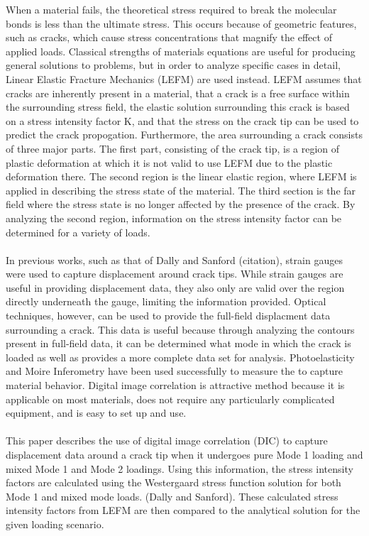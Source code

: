 \documentclass[12pt]{article}
\begin{document}
When a material fails, the theoretical stress required to break the molecular bonds is less than the ultimate stress. This occurs because of geometric features, such as cracks, which cause stress concentrations that magnify the effect of applied loads. Classical strengths of materials equations are useful for producing general solutions to problems, but in order to analyze specific cases in detail, Linear Elastic Fracture Mechanics (LEFM) are used instead. LEFM assumes that cracks are inherently present in a material, that a crack is a free surface within the surrounding stress field, the elastic solution surrounding this crack is based on a stress intensity factor K, and that the stress on the crack tip can be used to predict the crack propogation. Furthermore, the area surrounding a crack consists of three major parts. The first part, consisting of the crack tip, is a region of plastic deformation at which it is not valid to use LEFM due to the plastic deformation there. The second region is the linear elastic region, where LEFM is applied in describing the stress state of the material. The third section is the far field where the stress state is no longer affected by the presence of the crack. By analyzing the second region, information on the stress intensity factor can be determined for a variety of loads.
\\
\\
In previous works, such as that of Dally and Sanford (citation), strain gauges were used to capture displacement around crack tips. While strain gauges are useful in providing displacement data, they also only are valid over the region directly underneath the gauge, limiting the information provided. Optical techniques, however, can be used to provide the full-field displacment data surrounding a crack. This data is useful because through analyzing the contours present in full-field data, it can be determined what mode in which the crack is loaded as well as provides a more complete data set for analysis. Photoelasticity and Moire Inferometry have been used successfully to measure the to capture material behavior. Digital image correlation is attractive method because it is applicable on most materials, does not require any particularly complicated equipment, and is easy to set up and use.
\\
\\
This paper describes the use of digital image correlation (DIC) to capture displacement data around a crack tip when it undergoes pure Mode 1 loading and mixed Mode 1 and Mode 2 loadings. Using this information, the stress intensity factors are calculated using the Westergaard stress function solution for both Mode 1 and mixed mode loads. (Dally and Sanford). These calculated stress intensity factors from LEFM are then compared to the analytical solution for the given loading scenario.
\end{document}
